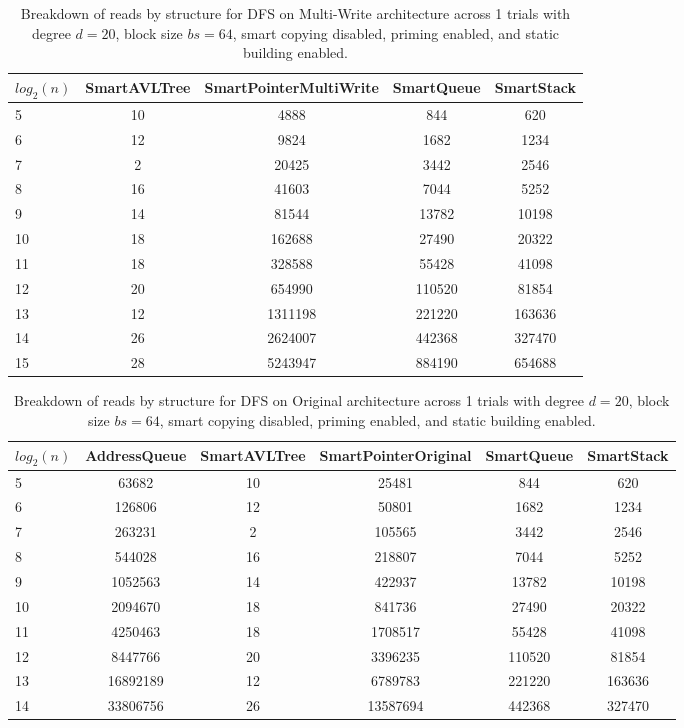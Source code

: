 \begin{table}[]
\centering
\begin{tabular}{|l|c|c|c|c|}
$log_2(n)$ & SmartAVLTree & SmartPointerMultiWrite & SmartQueue & SmartStack \\ \hline
5 & 10 & 4888 & 844 & 620 \\ \hline
6 & 12 & 9824 & 1682 & 1234 \\ \hline
7 & 2 & 20425 & 3442 & 2546 \\ \hline
8 & 16 & 41603 & 7044 & 5252 \\ \hline
9 & 14 & 81544 & 13782 & 10198 \\ \hline
10 & 18 & 162688 & 27490 & 20322 \\ \hline
11 & 18 & 328588 & 55428 & 41098 \\ \hline
12 & 20 & 654990 & 110520 & 81854 \\ \hline
13 & 12 & 1311198 & 221220 & 163636 \\ \hline
14 & 26 & 2624007 & 442368 & 327470 \\ \hline
15 & 28 & 5243947 & 884190 & 654688 \\ \hline
\end{tabular}
\caption{Breakdown of reads by structure for DFS on Multi-Write architecture across 1 trials with degree $d=20$, block size $bs=64$, smart copying disabled, priming enabled, and static building enabled.}
    \label{tab:reads_by_structure_dfs_d20_bs64_trials1_copiesfalse_primetrue_staticinsertiontrue_ptmultiwrite_movetrue}
\end{table}

\begin{table}[]
\centering
\begin{tabular}{|l|c|c|c|c|c|}
$log_2(n)$ & AddressQueue & SmartAVLTree & SmartPointerOriginal & SmartQueue & SmartStack \\ \hline
5 & 63682 & 10 & 25481 & 844 & 620 \\ \hline
6 & 126806 & 12 & 50801 & 1682 & 1234 \\ \hline
7 & 263231 & 2 & 105565 & 3442 & 2546 \\ \hline
8 & 544028 & 16 & 218807 & 7044 & 5252 \\ \hline
9 & 1052563 & 14 & 422937 & 13782 & 10198 \\ \hline
10 & 2094670 & 18 & 841736 & 27490 & 20322 \\ \hline
11 & 4250463 & 18 & 1708517 & 55428 & 41098 \\ \hline
12 & 8447766 & 20 & 3396235 & 110520 & 81854 \\ \hline
13 & 16892189 & 12 & 6789783 & 221220 & 163636 \\ \hline
14 & 33806756 & 26 & 13587694 & 442368 & 327470 \\ \hline
\end{tabular}
\caption{Breakdown of reads by structure for DFS on Original architecture across 1 trials with degree $d=20$, block size $bs=64$, smart copying disabled, priming enabled, and static building enabled.}
    \label{tab:reads_by_structure_dfs_d20_bs64_trials1_copiesfalse_primetrue_staticinsertiontrue_ptoriginal_movefalse}
\end{table}

